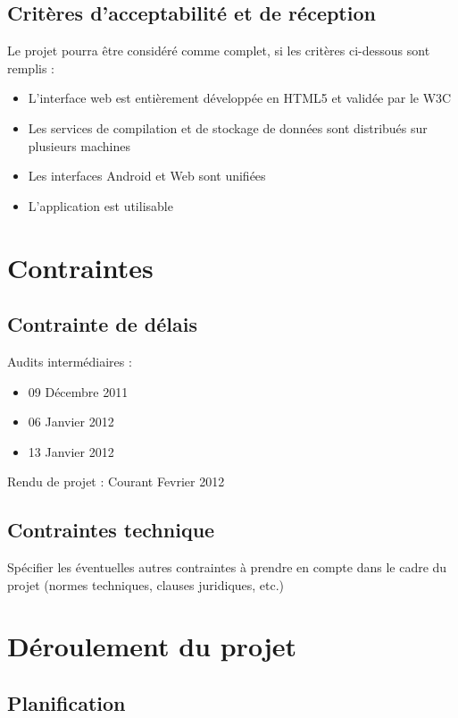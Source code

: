 \documentclass[a4paper,12pt]{article}
\begin{document}
\subsection{Critères d'acceptabilité et de réception}
 	
Le projet pourra être considéré comme complet, si les critères ci-dessous sont remplis :
\begin{itemize}
 \item L'interface web est entièrement développée en HTML5 et validée par le W3C
 \item Les services de compilation et de stockage de données sont distribués sur plusieurs machines
 \item Les interfaces Android et Web sont unifiées
 \item L'application est utilisable
\end{itemize}


\section{Contraintes}

\subsection{Contrainte de délais}

Audits intermédiaires :
\begin{itemize}
 \item 09 Décembre 2011
 \item 06 Janvier 2012
 \item 13 Janvier 2012
\end{itemize}

Rendu de projet : Courant Fevrier 2012

\subsection{Contraintes technique}
 	
Spécifier les éventuelles autres contraintes à prendre en compte dans le cadre du projet (normes techniques, clauses juridiques, etc.)

\section{Déroulement du projet}

\subsection{Planification}
\end{document}
